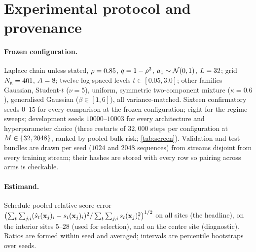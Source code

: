 \section{Experimental protocol and provenance}
\label{app:protocol}

\paragraph{Frozen configuration.}
Laplace chain unless stated, $\rho=0.85$, $q=1-\rho^2$, $a_1\sim\mathcal{N}\!\left(0,1\right)$,
$L=32$; grid $N_{\mathrm{g}}=401$, $A=8$; twelve log-spaced levels
$t\in[0.05,3.0]$; other families Gaussian, Student-$t$ ($\nu=5$), uniform, symmetric
two-component mixture ($\kappa=0.6$), generalised Gaussian ($\beta\in[1,6]$), all
variance-matched. Sixteen confirmatory seeds $0$--$15$ for every comparison at the frozen
configuration; eight for the regime sweeps; development seeds $10000$--$10003$ for every
architecture and hyperparameter choice (three restarts of $32{,}000$ steps per
configuration at $M\in\{32,2048\}$, ranked by pooled bulk risk; \cref{tab:screen}). Validation and test bundles are drawn
per seed ($1024$ and $2048$ sequences) from streams disjoint from every training stream;
their hashes are stored with every row so pairing across arms is checkable.

\paragraph{Estimand.}
Schedule-pooled relative score error
$\bigl(\sum_t\sum_{j,i}(\hat s_t(\mathbf{x}_j)_i-s_t(\mathbf{x}_j)_i)^2/\sum_t\sum_{j,i}s_t(\mathbf{x}_j)_i^2\bigr)^{1/2}$
on all sites (the headline), on the interior sites $5$--$28$ (used for selection), and on
the centre site (diagnostic). Ratios are formed within seed and averaged; intervals are
percentile bootstraps over seeds.



